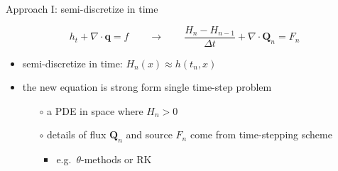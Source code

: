 \documentclass{beamer}
\newcommand\bq{\mathbf{q}}
\newcommand\bQ{\mathbf{Q}}
\newcommand{\Div}{\nabla\cdot}
\begin{document}
\begin{frame}{Approach I: semi-discretize in time}

$$h_t + \Div\bq = f \qquad \to \qquad \frac{H_n - H_{n-1}}{\Delta t} + \Div \bQ_n = F_n$$

  \begin{itemize}
  \item semi-discretize in time: $H_n(x) \approx h(t_n,x)$
  \item the new equation is strong form \alert{single time-step problem}
    \begin{itemize}
    \item[$\circ$] a PDE in space where $H_n>0$
    \item[$\circ$] details of flux $\bQ_n$ and source $F_n$ come from time-stepping scheme
      \begin{itemize}
      \item e.g.~$\theta$-methods or RK
      \end{itemize}
    \end{itemize}
  \end{itemize}
\end{frame}
\end{document}
